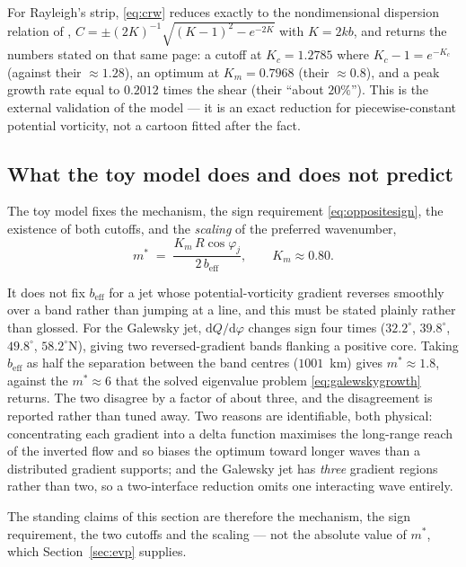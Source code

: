 \documentclass[11pt,a4paper]{article}
\newcommand{\dd}{\mathrm{d}}
\begin{document}
For Rayleigh's strip, \eqref{eq:crw} reduces exactly to the nondimensional
dispersion relation of \citet[Eq.~(6), p.~2838]{heifetz1999},
$C = \pm(2K)^{-1}\sqrt{(K-1)^2 - e^{-2K}}$ with $K = 2kb$, and returns the
numbers stated on that same page: a cutoff at $K_c = 1.2785$ where
$K_c - 1 = e^{-K_c}$ (against their $\approx 1.28$), an
optimum at $K_m = 0.7968$ (their $\approx 0.8$), and a peak growth rate equal to
$0.2012$ times the shear (their ``about $20\%$''). This is the external validation of the model --- it is an exact reduction
for piecewise-constant potential vorticity, not a cartoon fitted after the fact.

\subsection{What the toy model does and does not predict}

The toy model fixes the mechanism, the sign requirement \eqref{eq:oppositesign},
the existence of both cutoffs, and the \emph{scaling} of the preferred
wavenumber,
%
\begin{equation}
m^{*} \;=\; \frac{K_m\,R\cos\varphi_j}{2\,b_{\mathrm{eff}}} ,
\qquad K_m \approx 0.80 .
\label{eq:mstar}
\end{equation}

It does not fix $b_{\mathrm{eff}}$ for a jet whose potential-vorticity gradient
reverses smoothly over a band rather than jumping at a line, and this must be
stated plainly rather than glossed. For the Galewsky jet, $\dd Q/\dd\varphi$
changes sign four times ($32.2^\circ$, $39.8^\circ$, $49.8^\circ$,
$58.2^\circ$N), giving two reversed-gradient bands flanking a positive core.
Taking $b_{\mathrm{eff}}$ as half the separation between the band centres
($1001$~km) gives $m^{*} \approx 1.8$, against the $m^{*} \approx 6$ that the
solved eigenvalue problem \eqref{eq:galewskygrowth} returns. The two disagree by a
factor of about three, and the disagreement is reported rather than tuned away.
Two reasons are identifiable, both physical: concentrating each gradient into a
delta function maximises the long-range reach of the inverted flow and so biases
the optimum toward longer waves than a distributed gradient supports; and the
Galewsky jet has \emph{three} gradient regions rather than two, so a
two-interface reduction omits one interacting wave entirely.

The standing claims of this section are therefore the mechanism, the sign
requirement, the two cutoffs and the scaling --- not the absolute value of
$m^{*}$, which Section~\ref{sec:evp} supplies.
\end{document}
